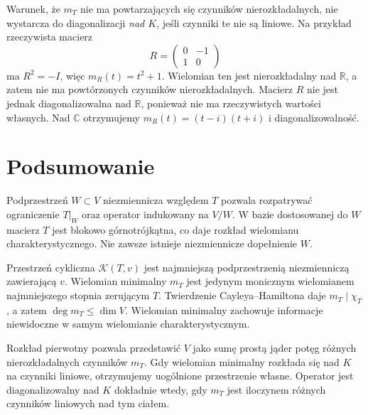 \begin{uwaga}
\label{rem:lin16-split-essential}
Warunek, że \(m_T\) nie ma powtarzających się
czynników nierozkładalnych, nie wystarcza
do diagonalizacji \emph{nad \(K\)},
jeśli czynniki te nie są liniowe.
Na przykład rzeczywista macierz
\[
 R=\begin{pmatrix}0&-1\\1&0\end{pmatrix}
\]
ma \(R^2=-I\), więc
\(m_R(t)=t^2+1\).
Wielomian ten jest nierozkładalny
nad \(\mathbb R\), a zatem nie ma
powtórzonych czynników nierozkładalnych.
Macierz \(R\) nie jest jednak
diagonalizowalna nad \(\mathbb R\),
ponieważ nie ma rzeczywistych
wartości własnych.
Nad \(\mathbb C\) otrzymujemy
\(m_R(t)=(t-i)(t+i)\)
i diagonalizowalność.
\end{uwaga}

\section{Podsumowanie}
\label{sec:lin16-summary}

Podprzestrzeń \(W\subset V\) niezmiennicza
względem \(T\) pozwala rozpatrywać
ograniczenie \(T|_W\) oraz operator
indukowany na \(V/W\).
W bazie dostosowanej do \(W\)
macierz \(T\) jest blokowo górnotrójkątna,
co daje rozkład wielomianu charakterystycznego.
Nie zawsze istnieje niezmiennicze dopełnienie \(W\).

Przestrzeń cykliczna \(\mathcal K(T,v)\)
jest najmniejszą podprzestrzenią niezmienniczą
zawierającą \(v\).
Wielomian minimalny \(m_T\) jest
jedynym monicznym wielomianem
najmniejszego stopnia zerującym \(T\).
Twierdzenie Cayleya--Hamiltona
daje \(m_T\mid\chi_T\), a zatem
\(\deg m_T\le\dim V\).
Wielomian minimalny zachowuje informacje
niewidoczne w samym wielomianie charakterystycznym.

Rozkład pierwotny pozwala przedstawić \(V\)
jako sumę prostą jąder potęg
różnych nierozkładalnych czynników \(m_T\).
Gdy wielomian minimalny rozkłada się nad \(K\)
na czynniki liniowe, otrzymujemy uogólnione przestrzenie własne.
Operator jest diagonalizowalny nad \(K\)
dokładnie wtedy, gdy \(m_T\)
jest iloczynem różnych czynników liniowych
nad tym ciałem.
